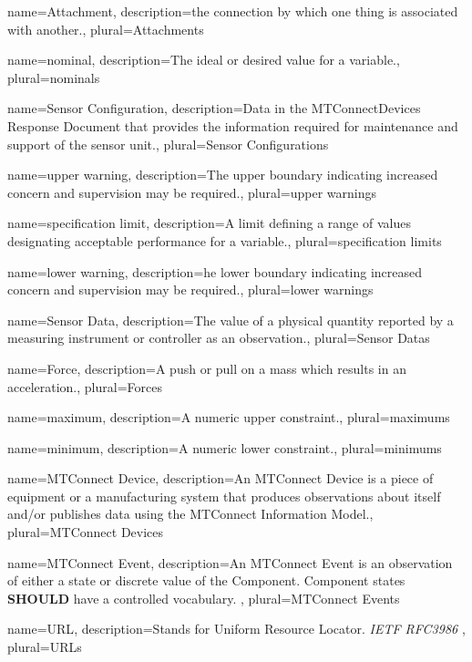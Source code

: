 {
    name={Attachment},
	description={the connection by which one thing is associated with another.},
	plural={Attachments}
}

{
    name={nominal},
	description={The ideal or desired value for a variable.},
	plural={nominals}
}

{
    name={Sensor Configuration},
	description={Data in the \gls{MTConnectDevices Response Document} that provides the information required for maintenance and support of the \gls{sensor unit}.},
	plural={Sensor Configurations}
}

{
    name={upper warning},
	description={The upper boundary indicating increased concern and supervision may be required.},
	plural={upper warnings}
}

{
    name={specification limit},
	description={A limit defining a range of values designating acceptable performance for a variable.},
	plural={specification limits}
}

{
    name={lower warning},
	description={he lower boundary indicating increased concern and supervision may be required.},
	plural={lower warnings}
}

{
    name={Sensor Data},
	description={The value of a physical quantity reported by a measuring instrument or controller as an \gls{observation}.},
	plural={Sensor Datas}
}

{
    name={Force},
	description={A push or pull on a mass which results in an acceleration.},
	plural={Forces}
}

{
    name={maximum},
	description={A numeric upper constraint.},
	plural={maximums}
}

{
    name={minimum},
	description={A numeric lower constraint.},
	plural={minimums}
}

{
    name={MTConnect Device},
	description={An \gls{MTConnect Device} is a piece of equipment or a manufacturing system that produces \glspl{observation} about itself and/or publishes data using the \gls{MTConnect Information Model}.},
	plural={MTConnect Devices}
}

{
    name={MTConnect Event},
	description={An \gls{MTConnect Event} is an \gls{observation} of either a state or discrete value of the \gls{Component}. \gls{Component} states \textbf{SHOULD} have a controlled vocabulary.
},
	plural={MTConnect Events}
}

{
    name={URL},
	description={Stands for Uniform Resource Locator. \textit{IETF RFC3986}
},
	plural={URLs}
}
